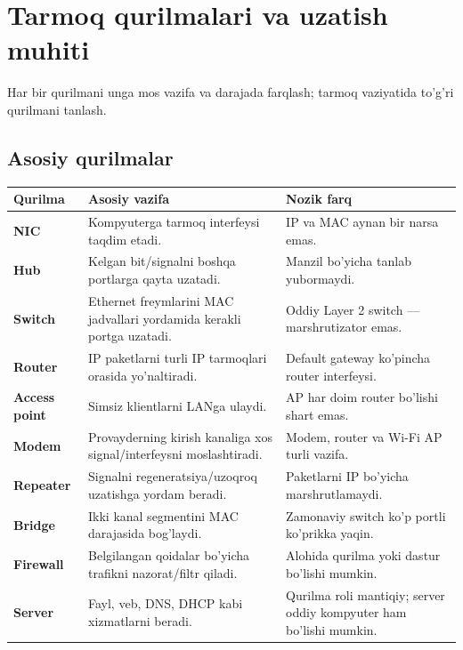 \documentclass[11pt,a4paper,oneside]{book}
\newcommand{\kw}[1]{\textbf{\color{Deep}#1}}
\begin{document}
\chapter{Tarmoq qurilmalari va uzatish muhiti}
\begin{goal}Har bir qurilmani unga mos vazifa va darajada farqlash; tarmoq vaziyatida to'g'ri qurilmani tanlash.\end{goal}
\section{Asosiy qurilmalar}
\par\medskip
\begin{longtable}{p{}p{}p{}}\toprule
Qurilma & Asosiy vazifa & Nozik farq\\\midrule\endhead
\kw{NIC} & Kompyuterga tarmoq interfeysi taqdim etadi. & IP va MAC aynan bir narsa emas.\\
\kw{Hub} & Kelgan bit/signalni boshqa portlarga qayta uzatadi. & Manzil bo'yicha tanlab yubormaydi.\\
\kw{Switch} & Ethernet freymlarini MAC jadvallari yordamida kerakli portga uzatadi. & Oddiy Layer 2 switch — marshrutizator emas.\\
\kw{Router} & IP paketlarni turli IP tarmoqlari orasida yo'naltiradi. & Default gateway ko'pincha router interfeysi.\\
\kw{Access point} & Simsiz klientlarni LANga ulaydi. & AP har doim router bo'lishi shart emas.\\
\kw{Modem} & Provayderning kirish kanaliga xos signal/interfeysni moslashtiradi. & Modem, router va Wi-Fi AP turli vazifa.\\
\kw{Repeater} & Signalni regeneratsiya/uzoqroq uzatishga yordam beradi. & Paketlarni IP bo'yicha marshrutlamaydi.\\
\kw{Bridge} & Ikki kanal segmentini MAC darajasida bog'laydi. & Zamonaviy switch ko'p portli ko'prikka yaqin.\\
\kw{Firewall} & Belgilangan qoidalar bo'yicha trafikni nazorat/filtr qiladi. & Alohida qurilma yoki dastur bo'lishi mumkin.\\
\kw{Server} & Fayl, veb, DNS, DHCP kabi xizmatlarni beradi. & Qurilma roli mantiqiy; server oddiy kompyuter ham bo'lishi mumkin.\\\bottomrule
\end{longtable}
\end{document}
